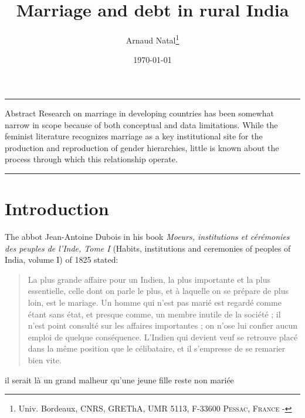 \documentclass[a4paper, 11pt, onecolumn]{article}
\title{Marriage and debt in rural India}
\author{Arnaud Natal\thanks{Univ. Bordeaux, CNRS, GREThA, UMR 5113, F-33600 \textsc{Pessac, France} - \email{arnaud.natal@u-bordeaux.fr}}}
\date{\today}
\begin{document}
\maketitle

\hrule 
\vspace{0.3cm}

\begin{resab}{Abstract}
Research on marriage in developing countries has been somewhat narrow in scope because of both conceptual and data limitations.
While the feminist literature recognizes marriage as a key institutional site for the production and reproduction of gender hierarchies, little is known about the process through which this relationship operate.

\end{resab}

\begin{keywords}

\end{keywords}

\begin{jelcodes}

\end{jelcodes}

\hrule

\clearpage
\newpage
\section{Introduction}
\label{Introduction}

The abbot Jean-Antoine Dubois in his book \textit{Moeurs, institutions et cérémonies des peuples de l'Inde, Tome I} (Habits, institutions and ceremonies of peoples of India, volume I) of 1825 stated:
\begin{quote}
La plus grande affaire pour un Indien, la plus importante et la plus essentielle, celle dont on parle le plus, et à laquelle on se prépare de plus loin, est le mariage.
Un homme qui n’est pas marié est regardé comme étant sans état, et presque comme, un membre inutile de la société ; il n’est point consulté sur les affaires importantes ; on n’ose lui confier aucun emploi de quelque conséquence.
L’Indien qui devient veuf se retrouve placé dans la même position que le célibataire, et il s’empresse de se remarier bien vite.
\end{quote}

\cite{Regnault1891} il serait là un grand malheur qu’une jeune fille reste non mariée
\end{document}
